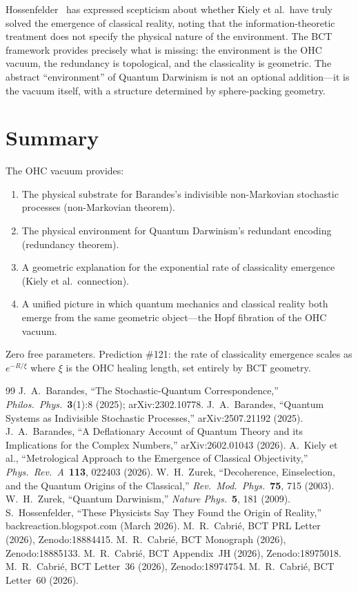 \documentclass[aps,prl,preprint,superscriptaddress,floatfix]{revtex4-2}
\begin{document}
Hossenfelder~\cite{sabine2026} has expressed scepticism about whether
Kiely et al.\ have truly solved the emergence of classical reality,
noting that the information-theoretic treatment does not specify the
physical nature of the environment. The BCT framework provides precisely
what is missing: the environment is the OHC vacuum, the redundancy is
topological, and the classicality is geometric. The abstract ``environment''
of Quantum Darwinism is not an optional addition---it is the vacuum itself,
with a structure determined by sphere-packing geometry.

\section{Summary}

The OHC vacuum provides:
\begin{enumerate}
\item The physical substrate for Barandes's indivisible non-Markovian
stochastic processes (non-Markovian theorem).
\item The physical environment for Quantum Darwinism's redundant encoding
(redundancy theorem).
\item A geometric explanation for the exponential rate of classicality
emergence (Kiely et al.\ connection).
\item A unified picture in which quantum mechanics and classical reality
both emerge from the same geometric object---the Hopf fibration of the
OHC vacuum.
\end{enumerate}
Zero free parameters. Prediction \#121: the rate of classicality emergence
scales as $e^{-R/\xi}$ where $\xi$ is the OHC healing length, set entirely
by BCT geometry.

\begin{thebibliography}{99}
 J.~A.~Barandes, ``The Stochastic-Quantum Correspondence,''
  \textit{Philos.\ Phys.}\ \textbf{3}(1):8 (2025); arXiv:2302.10778.
 J.~A.~Barandes, ``Quantum Systems as Indivisible
  Stochastic Processes,'' arXiv:2507.21192 (2025).
 J.~A.~Barandes, ``A Deflationary Account of Quantum
  Theory and its Implications for the Complex Numbers,'' arXiv:2602.01043 (2026).
 A.~Kiely et al., ``Metrological Approach to the Emergence
  of Classical Objectivity,'' \textit{Phys.\ Rev.\ A}\ \textbf{113}, 022403 (2026).
 W.~H.~Zurek, ``Decoherence, Einselection, and the Quantum
  Origins of the Classical,'' \textit{Rev.\ Mod.\ Phys.}\ \textbf{75}, 715 (2003).
 W.~H.~Zurek, ``Quantum Darwinism,''
  \textit{Nature Phys.}\ \textbf{5}, 181 (2009).
 S.~Hossenfelder, ``These Physicists Say They Found the
  Origin of Reality,'' backreaction.blogspot.com (March 2026).
 M.~R.~Cabri\'e, BCT PRL Letter (2026), Zenodo:18884415.
 M.~R.~Cabri\'e, BCT Monograph (2026), Zenodo:18885133.
 M.~R.~Cabri\'e, BCT Appendix~JH (2026), Zenodo:18975018.
 M.~R.~Cabri\'e, BCT Letter~36 (2026), Zenodo:18974754.
 M.~R.~Cabri\'e, BCT Letter~60 (2026).
\end{thebibliography}
\end{document}
